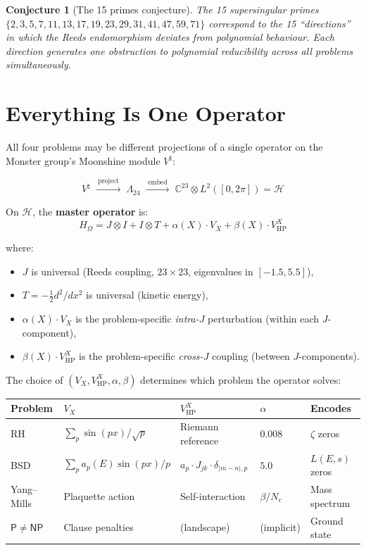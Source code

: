 \documentclass[11pt,a4paper]{article}
\theoremstyle{plain}
\newtheorem{conjecture}[theorem]{Conjecture}
\theoremstyle{definition}
\theoremstyle{remark}
\begin{document}
\begin{conjecture}[The 15 primes conjecture]
The 15 supersingular primes $\{2,3,5,7,11,13,17,19,23,29,31,41,47,59,71\}$ correspond to the 15 ``directions'' in which the Reeds endomorphism deviates from polynomial behaviour. Each direction generates one obstruction to polynomial reducibility across all problems simultaneously.
\end{conjecture}

\section{Everything Is One Operator}

All four problems may be different projections of a single operator on the Monster group's Moonshine module $V^\natural$:

\[
V^\natural \;\xrightarrow{\;\text{project}\;}\; \Lambda_{24} \;\xrightarrow{\;\text{embed}\;}\; \mathbb{C}^{23} \otimes L^2([0,2\pi]) = \mathcal{H}
\]

On $\mathcal{H}$, the \textbf{master operator} is:
\begin{equation}
\boxed{H_\Omega = J \otimes I + I \otimes T + \alpha(X) \cdot V_X + \beta(X) \cdot V_{\text{HP}}^X}
\end{equation}

where:
\begin{itemize}[nosep]
\item $J$ is universal (Reeds coupling, $23 \times 23$, eigenvalues in $[-1.5, 5.5]$),
\item $T = -\frac{1}{2}d^2/dx^2$ is universal (kinetic energy),
\item $\alpha(X) \cdot V_X$ is the problem-specific \emph{intra-$J$} perturbation (within each $J$-component),
\item $\beta(X) \cdot V_{\text{HP}}^X$ is the problem-specific \emph{cross-$J$} coupling (between $J$-components).
\end{itemize}

The choice of $(V_X, V_{\text{HP}}^X, \alpha, \beta)$ determines which problem the operator solves:

\begin{center}\small
\begin{tabular}{lllll}
\toprule
Problem & $V_X$ & $V_{\text{HP}}^X$ & $\alpha$ & Encodes \\
\midrule
RH & $\sum_p \sin(px)/\sqrt{p}$ & Riemann reference & $0.008$ & $\zeta$ zeros \\
BSD & $\sum_p a_p(E)\sin(px)/p$ & $a_p \cdot J_{jk} \cdot \delta_{|m-n|,p}$ & $5.0$ & $L(E,s)$ zeros \\
Yang--Mills & Plaquette action & Self-interaction & $\beta/N_c$ & Mass spectrum \\
$\mathsf{P} \neq \mathsf{NP}$ & Clause penalties & (landscape) & (implicit) & Ground state \\
\bottomrule
\end{tabular}
\end{center}
\end{document}
